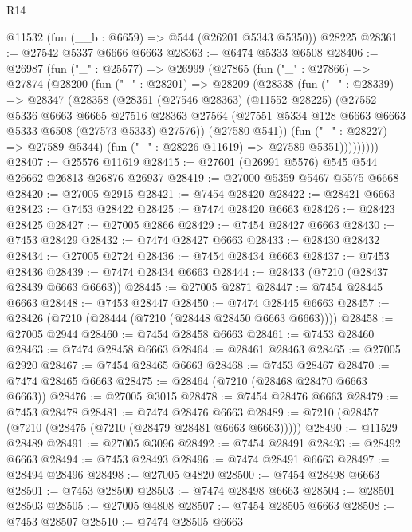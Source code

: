 \begin{lexlean}{R14}
\begin{coremodule}
    @11532
    (fun (__b : @6659) => @544 (@26201 @5343 @5350))
    @28225
@28361 := @27542 @5337 @6666 @6663
@28363 := @6474 @5333 @6508
@28406 := @26987
    (fun ("_" : @25577) =>
    @26999
      (@27865
        (fun ("_" : @27866) =>
        @27874
          (@28200
            (fun ("_" : @28201) =>
            @28209
              (@28338
                (fun ("_" : @28339) =>
                @28347
                  (@28358
                    (@28361
                      (@27546 @28363)
                      (@11552 @28225)
                      (@27552
                        @5336
                        @6663
                        @6665
                        @27516
                        @28363
                        @27564
                        (@27551 @5334 @128 @6663 @6663 @5333 @6508 (@27573 @5333) @27576))
                      (@27580 @541))
                    (fun ("_" : @28227) => @27589 @5344)
                    (fun ("_" : @28226 @11619) => @27589 @5351)))))))))
@28407 := @25576 @11619
@28415 := @27601 (@26991 @5576) @545 @544 @26662 @26813 @26876 @26937
@28419 := @27000 @5359 @5467 @5575 @6668
@28420 := @27005 @2915
@28421 := @7454 @28420
@28422 := @28421 @6663
@28423 := @7453 @28422
@28425 := @7474 @28420 @6663
@28426 := @28423 @28425
@28427 := @27005 @2866
@28429 := @7454 @28427 @6663
@28430 := @7453 @28429
@28432 := @7474 @28427 @6663
@28433 := @28430 @28432
@28434 := @27005 @2724
@28436 := @7454 @28434 @6663
@28437 := @7453 @28436
@28439 := @7474 @28434 @6663
@28444 := @28433 (@7210 (@28437 @28439 @6663 @6663))
@28445 := @27005 @2871
@28447 := @7454 @28445 @6663
@28448 := @7453 @28447
@28450 := @7474 @28445 @6663
@28457 := @28426 (@7210 (@28444 (@7210 (@28448 @28450 @6663 @6663))))
@28458 := @27005 @2944
@28460 := @7454 @28458 @6663
@28461 := @7453 @28460
@28463 := @7474 @28458 @6663
@28464 := @28461 @28463
@28465 := @27005 @2920
@28467 := @7454 @28465 @6663
@28468 := @7453 @28467
@28470 := @7474 @28465 @6663
@28475 := @28464 (@7210 (@28468 @28470 @6663 @6663))
@28476 := @27005 @3015
@28478 := @7454 @28476 @6663
@28479 := @7453 @28478
@28481 := @7474 @28476 @6663
@28489 := @7210 (@28457 (@7210 (@28475 (@7210 (@28479 @28481 @6663 @6663)))))
@28490 := @11529 @28489
@28491 := @27005 @3096
@28492 := @7454 @28491
@28493 := @28492 @6663
@28494 := @7453 @28493
@28496 := @7474 @28491 @6663
@28497 := @28494 @28496
@28498 := @27005 @4820
@28500 := @7454 @28498 @6663
@28501 := @7453 @28500
@28503 := @7474 @28498 @6663
@28504 := @28501 @28503
@28505 := @27005 @4808
@28507 := @7454 @28505 @6663
@28508 := @7453 @28507
@28510 := @7474 @28505 @6663

\end{coremodule}
\end{lexlean}
